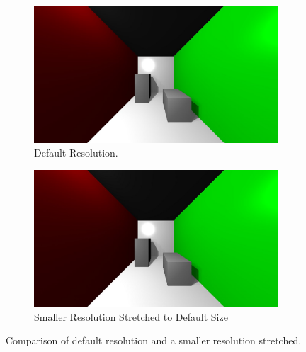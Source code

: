 \begin{figure}
        \centering
        \begin{subfigure}[b]{1.0\textwidth}
                \includegraphics[width=\textwidth]{sample1.jpg}
                \caption{Default Resolution.}
                \label{fig:defaultresolution}
        \end{subfigure}
        \begin{subfigure}[b]{1.0\textwidth}
                \includegraphics[width=\textwidth]{17_resize.jpg}
                \caption{Smaller Resolution Stretched to Default Size}
                \label{fig:smallerresolution}
        \end{subfigure}
        \caption{Comparison of default resolution and a smaller resolution stretched.}\label{fig:artifacts}
\end{figure}

